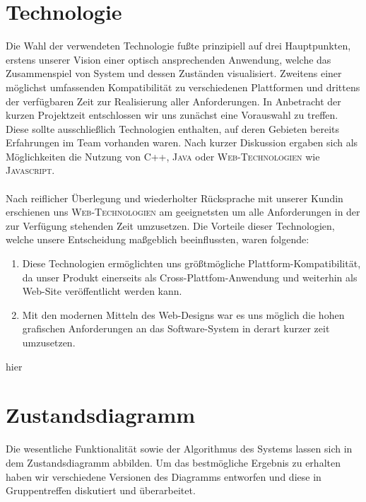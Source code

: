 \section{Technologie}
Die Wahl der verwendeten Technologie fußte prinzipiell auf drei Hauptpunkten, erstens unserer Vision einer optisch ansprechenden Anwendung, welche das Zusammenspiel von System und dessen Zuständen visualisiert. Zweitens einer möglichst umfassenden Kompatibilität zu verschiedenen Plattformen und drittens der verfügbaren Zeit zur Realisierung aller Anforderungen. In Anbetracht der kurzen Projektzeit entschlossen wir uns zunächst eine Vorauswahl zu treffen. Diese sollte ausschließlich Technologien enthalten, auf deren Gebieten bereits Erfahrungen im Team vorhanden waren. Nach kurzer Diskussion ergaben sich als Möglichkeiten die Nutzung von \textsc{C++}, \textsc{Java} oder \textsc{Web-Technologien} wie \textsc{Javascript}.

\paragraph*{}Nach reiflicher Überlegung und wiederholter Rücksprache mit unserer Kundin erschienen uns \textsc{Web-Technologien} am geeignetsten um alle Anforderungen in der zur Verfügung stehenden Zeit umzusetzen. Die Vorteile dieser Technologien, welche unsere Entscheidung maßgeblich beeinflussten, waren folgende:

\begin{enumerate}
	\item Diese Technologien ermöglichten uns größtmögliche Plattform-Kompa\-tibilität, da unser Produkt einerseits als Cross-Plattfom-Anwendung und weiterhin als Web-Site veröffentlicht werden kann.
	\item Mit den modernen Mitteln des Web-Designs war es uns möglich die hohen grafischen Anforderungen an das Software-System in derart kurzer zeit umzusetzen.
\end{enumerate}

hier

\section{Zustandsdiagramm}
Die wesentliche Funktionalität sowie der Algorithmus des Systems lassen sich in
dem Zustandsdiagramm abbilden. Um das bestmögliche Ergebnis zu erhalten haben
wir verschiedene Versionen des Diagramms entworfen und diese in Gruppentreffen diskutiert und überarbeitet.

